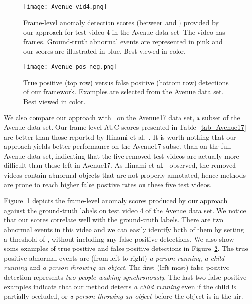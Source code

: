 \documentclass[10pt,twocolumn,letterpaper]{article}
\begin{document}
\begin{figure}[!t]
\begin{center}
\texttt{[image: Avenue\_vid4.png]}
\end{center}
\vspace*{-0.3cm}
\caption{Frame-level anomaly detection scores (between  and ) provided by our approach for test video 4 in the Avenue data set. The video has  frames. Ground-truth abnormal events are represented in pink and our scores are illustrated in blue. Best viewed in color.}
\label{fig_Avenue_vid4}
\end{figure}

\begin{figure}[!t]
\begin{center}
\texttt{[image: Avenue\_pos\_neg.png]}
\end{center}
\vspace*{-0.3cm}
\caption{True positive (top row) versus false positive (bottom row) detections of our framework. Examples are selected from the Avenue data set. Best viewed in color.}
\label{fig_Avenue_pos_neg}
\vspace*{-0.4cm}
\end{figure}

We also compare our approach with~\cite{Hinami-ICCV-2017} on the Avenue17 data set, a subset of the Avenue data set. Our frame-level AUC scores presented in Table~\ref{tab_Avenue17} are better than those reported by Hinami et al.~\cite{Hinami-ICCV-2017}. It is worth nothing that our approach yields better performance on the Avenue17 subset than on the full Avenue data set, indicating that the five removed test videos are actually more difficult than those left in Avenue17. As Hinami et al.~\cite{Hinami-ICCV-2017} observed, the removed videos contain abnormal objects that are not properly annotated, hence methods are prone to reach higher false positive rates on these five test videos.

Figure~\ref{fig_Avenue_vid4} depicts the frame-level anomaly scores produced by our approach against the ground-truth labels on test video 4 of the Avenue data set. We notice that our scores correlate well with the ground-truth labels. There are two abnormal events in this video and we can easily identify both of them by setting a threshold of , without including any false positive detections. We also show some examples of true positive and false positive detections in Figure~\ref{fig_Avenue_pos_neg}. The true positive abnormal events are (from left to right) \emph{a person running}, \emph{a child running} and \emph{a person throwing an object}. The first (left-most) false positive detection represents \emph{two people walking synchronously}. The last two false positive examples indicate that our method detects \emph{a child running} even if the child is partially occluded, or \emph{a person throwing an object} before the object is in the air.
\end{document}
